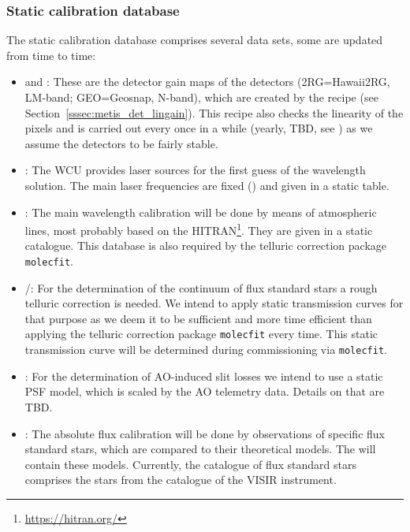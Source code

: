 \subsubsection{Static calibration database}\label{lss:static_calib}
The static calibration database comprises several data sets, some are updated from time to time:
\begin{itemize}
    \item \hyperref[dataitem:gainmap2rg]{\hyperref[dataitem:gainmap2rg]{}} and \hyperref[dataitem:gainmapgeo]{\hyperref[dataitem:gainmap2rg]{}}: These are the detector gain maps of the detectors (2RG=Hawaii2RG, LM-band; GEO=Geosnap, N-band), which are created by the recipe \hyperref[sssec:metis_det_lingain]{} (see Section~\ref{sssec:metis_det_lingain}). This recipe also checks the linearity of the pixels and is carried out every once in a while (yearly, TBD, see \cite{METIS-calibration_plan}) as we assume the detectors to be fairly stable.
    \item \hyperref[dataitem:lasertab]{}: The \ac{WCU} provides laser sources for the first guess of the wavelength solution. The main laser frequencies are fixed (\cite{METIS-calibration_plan}) and given in a static table.
    \item \hyperref[dataitem:atmlinecat]{}: The main wavelength calibration will be done by means of atmospheric lines, most probably based on the \ac{HITRAN}\footnote{\url{https://hitran.org/}}. They are given in a static catalogue. This database is also required by the telluric correction package \texttt{molecfit}.
    \item \hyperref[dataitem:lmsynthtrans]{}/\hyperref[dataitem:nsynthtrans]{}: For the determination of the continuum of flux standard stars a rough telluric correction is needed. We intend to apply static transmission curves for that purpose as we deem it to be sufficient and more time efficient than applying the telluric correction package \texttt{molecfit} every time. This static transmission curve will be determined during commissioning via \texttt{molecfit}.
    \item \hyperref[dataitem:aopsfmodel]{}: For the determination of \ac{AO}-induced slit losses we intend to use a static \ac{PSF} model, which is scaled by the \ac{AO} telemetry data. Details on that are TBD.
    \item \hyperref[dataitem:reffluxcat]{}: The absolute flux calibration will be done by observations of specific flux standard stars, which are compared to their theoretical models. The \hyperref[dataitem:reffluxcat]{} will contain these models. Currently, the catalogue of flux standard stars comprises the stars from the catalogue of the \ac{VISIR} instrument.

\end{itemize}
